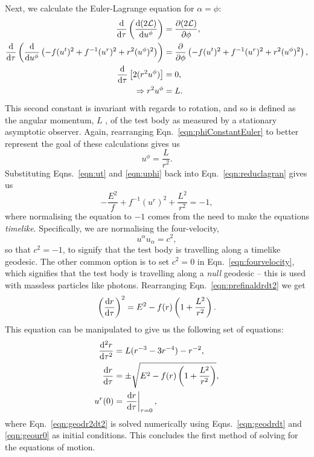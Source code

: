 Next, we calculate the Euler-Lagrange equation for $\alpha=\phi$:
\begin{align}
    \dv{}{\tau}\left(\dv{(2\mathcal{L})}{u^\phi} \right)&=\pdv{(2\mathcal{L})}{\phi},\\
    \dv{}{\tau}\left(\dv{}{u^\phi}\left( -f(u^t)^2+f^{-1}(u^r)^2+r^2(u^\phi)^2\right) \right)&=\pdv{}{\phi}\left( -f(u^t)^2+f^{-1}(u^r)^2+r^2(u^\phi)^2\right),\\
    \dv{}{\tau}\left[2(r^2u^\phi) \right]&=0,\\
    \Rightarrow r^2u^\phi&=L. \label{eqn:phiConstantEuler}
\end{align}
This second constant is invariant with regards to rotation, and so is defined as the angular momentum, $L$ \cite{introCondensed}, of the test body as measured by a stationary asymptotic observer.
Again, rearranging Eqn.~\eqref{eqn:phiConstantEuler} to better represent the goal of these calculations gives us
\begin{equation}\label{eqn:uphi}
    u^\phi=\frac{L}{r^2}.
\end{equation}
Substituting Eqns.~\eqref{eqn:ut} and \eqref{eqn:uphi} back into Eqn.~\eqref{eqn:reduclagran} gives us
\begin{equation}\label{eqn:prefinaldrdt2}
-\frac{E^2}{f}+f^{-1}(u^r)^2+\frac{L^2}{r^2}=-1,
\end{equation}
where normalising the equation to $-1$ comes from the need to make the equations \textit{timelike}.
Specifically, we are normalising the four-velocity,
\begin{equation}\label{eqn:fourvelocity}
u^\alpha u_\alpha=c^2,
\end{equation}
so that $c^2=-1$, to signify that the test body is travelling along a timelike geodesic.
The other common option is to set $c^2=0$ in Eqn.~\eqref{eqn:fourvelocity}, which signifies that the test body is travelling along a \textit{null} geodesic -- this is used with massless particles like photons.
Rearranging Eqn.~\eqref{eqn:prefinaldrdt2} we get
\begin{equation}\label{eqn:drdt2}
\left(\dv{r}{\tau}\right)^2=E^2-f(r)\left(1+\frac{L^2}{r^2}\right).
\end{equation}
This equation can be manipulated to give us the following set of equations:
\begin{align}
    \dv[2]{r}{\tau}&=L(r^{-3}-3r^{-4})-r^{-2},\label{eqn:geodr2dt2}\\
    \dv{r}{\tau}&=\pm\sqrt{E^2-f(r)\left(1+\frac{L^2}{r^2}\right)},\label{eqn:geodrdt} \\
    u^r(0)&=\left.\dv{r}{\tau}(0)\right|_{\tau=0},\label{eqn:geour0}
\end{align}
where Eqn.~\eqref{eqn:geodr2dt2} is solved numerically using Eqns.~\eqref{eqn:geodrdt} and \eqref{eqn:geour0} as initial conditions.
This concludes the first method of solving for the equations of motion.

